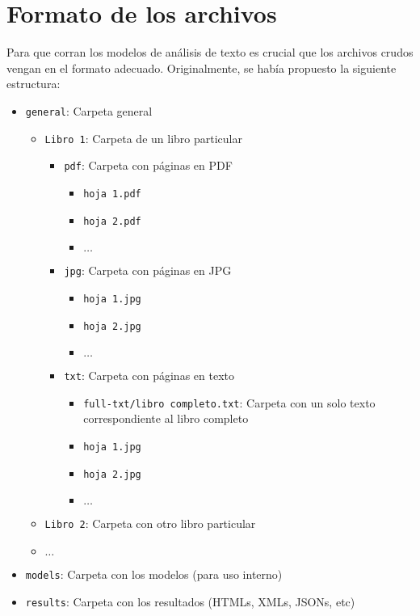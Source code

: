 \documentclass[11pt]{article}
\begin{document}
\section{Formato de los archivos}

Para que corran los modelos de análisis de texto es crucial que los archivos crudos vengan en el formato adecuado. Originalmente, se había propuesto la siguiente estructura:

\begin{itemize}
	\item \texttt{general}: Carpeta general
	\begin{itemize}
		\item \texttt{Libro 1}: Carpeta de un libro particular
		\begin{itemize}
			\item \texttt{pdf}: Carpeta con páginas en PDF
			\begin{itemize}
				\item \texttt{hoja 1.pdf}
				\item \texttt{hoja 2.pdf}
				\item $\dots$
			\end{itemize}
			\item \texttt{jpg}: Carpeta con páginas en JPG
			\begin{itemize}
				\item \texttt{hoja 1.jpg}
				\item \texttt{hoja 2.jpg}
				\item $\dots$
			\end{itemize}
			\item \texttt{txt}: Carpeta con páginas en texto
			\begin{itemize}
				\item \texttt{full-txt/libro completo.txt}: Carpeta con un solo texto correspondiente al libro completo
				\item \texttt{hoja 1.jpg}
				\item \texttt{hoja 2.jpg}
				\item $\dots$
			\end{itemize}
		\end{itemize}
		\item \texttt{Libro 2}: Carpeta con otro libro particular
		\item $\dots$
	\end{itemize}
	\item \texttt{models}: Carpeta con los modelos (para uso interno)
	\item \texttt{results}: Carpeta con los resultados (HTMLs, XMLs, JSONs, etc)
\end{itemize}
\end{document}
